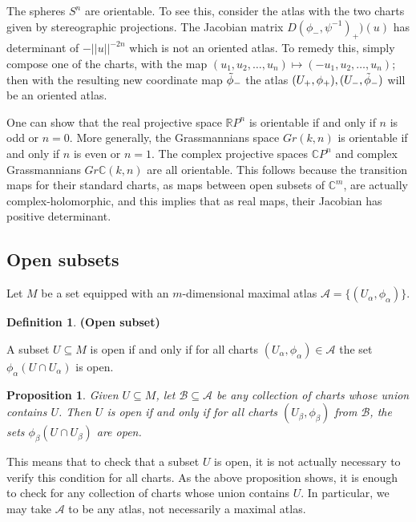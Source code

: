 \documentclass{article}
\newtheorem{proposition}{Proposition}[theorem]
\theoremstyle{definition}
\newtheorem{defn}[theorem]{Definition}
\newenvironment{definition}
  {\vspace{8pt}\begin{mdframed}[backgroundcolor=blueish,innertopmargin=4]\begin{defn}}
  {\end{defn}\end{mdframed}\vspace{4pt}}
\begin{document}
The spheres $S^n$ are orientable. To see this, consider the atlas with the two charts given by stereographic projections. The Jacobian matrix $D(\phi_-, \psi^{-1})_+)(u)$ has determinant of $-||u||^{-2n}$ which  is not an oriented atlas. To remedy this, simply compose one of the charts, with the map $(u_1,u_2,\dots,u_n) \mapsto (-u_1,u_2,\dots,u_n)$; then with the resulting new coordinate map $\Tilde{\phi}_-$ the atlas $(U_+,\phi_+),(U_-,\Tilde{\phi}_-)$ will be an oriented atlas.

One can show that the real projective space $\mathbb R P^n$ is orientable if and only if $n$ is odd or $n = 0$. More generally, the Grassmannians space $Gr(k,n)$ is orientable if and only if $n$ is even or $n = 1$. The complex projective spaces $\mathbb C P^n$ and complex Grassmannians $Gr \mathbb C(k,n)$ are all orientable. This
follows because the transition maps for their standard charts, as maps between open subsets of $\mathbb C^m$, are actually complex-holomorphic, and this implies that as real maps, their Jacobian has positive determinant.


\subsection{Open subsets}

Let $M$ be a set equipped with an $m$-dimensional maximal atlas $\mathscr{A} =  \{(U_\alpha, \phi_\alpha) \}$.

\begin{definition} \textbf{(Open subset)}

A subset $U \subseteq M$ is open if and only if for all charts $(U_\alpha, \phi_\alpha) \in \mathscr{A}$ the set $\phi_\alpha(U  \cap U_\alpha)$ is open.
\end{definition}

\begin{proposition}

Given $U \subseteq M$, let $ \mathscr{B} \subseteq \mathscr{A}$ be any collection of charts whose union contains $U$. Then $U$ is open if and only if for all charts $(U_\beta,\phi_\beta)$ from $\mathscr{B}$, the sets $\phi_{\beta}(U \cap U_\beta)$ are open.
\end{proposition}

This means that to check that a subset $U$ is open, it is not actually necessary to verify this condition for all charts. As the above proposition shows, it is enough to check for any collection of charts whose union contains $U$. In particular, we may take $\mathscr{A}$ to be any atlas, not necessarily a maximal atlas.
\end{document}
